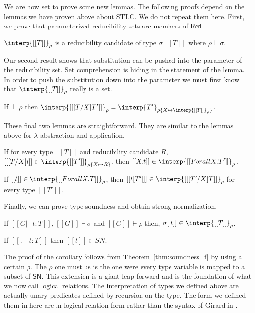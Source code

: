 We are now set to prove some new lemmas.  The following proofs depend
on the lemmas we have proven above about STLC.  We do not repeat them
here.  First, we prove that parameterized reducibility sets are members
of $\mathsf{Red}$.
\begin{lemma}
  \label{lemma:sn_f_cand}
  $\interp{[[T]]}_\rho$ is a reducibility candidate of type $\sigma\,[[T]]$ 
  where $\rho \vdash \sigma$.
\end{lemma}
\noindent
Our second result shows that substitution can be pushed into the
parameter of the reducibility set.  Set comprehension is hiding in
the statement of the lemma.  In order to push the substitution down into
the parameter we must first know that $\interp{[[T]]}_\rho$ really is
a set.
\begin{lemma}
  \label{lemma:red_subst}
  If $\vdash \rho$ then $\interp{[[ [T/X]T']]}_\rho = \interp{T'}_{\rho\{ X \mapsto \interp{[[T]]}_\rho\}}$.
\end{lemma}
\noindent
These final two lemmas are straightforward.  They are similar to the
lemmas above for $\lambda$-abstraction and application.
\begin{lemma}
  \label{lemma:red_f_univ_abs}
  If for every type $[[T]]$ and reducibility candidate $R$, $[[ [T/X]t]] \in \interp{[[T']]}_{\rho\{X \mapsto R\}}$, then
  $[[\\ X.t]] \in \interp{[[Forall X.T']]}_\rho$.
\end{lemma}

\begin{lemma}
  \label{lemma:red_f_univ_app}
  If $[[t]] \in \interp{[[Forall X.T]]}_\rho$, then $[[t [T'] ]] \in \interp{[[ [T'/X]T]]}_\rho$ for every type $[[T']]$.
\end{lemma}
\noindent
Finally, we can prove type soundness and obtain strong normalization.
\begin{thm}
  \label{thm:soundness_f}
  If $[[G |- t : T]]$, $[[G]] \vdash \sigma$ and $[[G]] \vdash \rho$ then,
  $\sigma [[t]] \in \interp{[[T]]}_{\rho}$.
\end{thm}

\begin{corollary}
  \label{corollary:sn_f}
  If $[[. |- t : T]]$ then $[[t]] \in SN$.
\end{corollary}
\noindent
The proof of the corollary follows from Theorem~\ref{thm:soundness_f}
by using a certain $\rho$.  The $\rho$ one must us is the one were
every type variable is mapped to a subset of $\mathsf{SN}$.  This
extension is a giant leap forward and is the foundation of what we now
call logical relations.  The interpretation of types we defined above
are actually unary predicates defined by recursion on the type.  The
form we defined them in here are in logical relation form rather than
the syntax of Girard in \cite{Girard:1989}.
